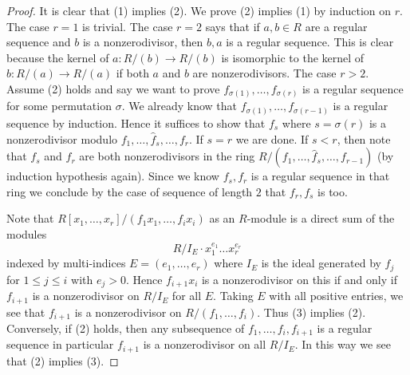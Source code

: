 \begin{proof}
It is clear that (1) implies (2). We prove (2) implies (1) by induction
on $r$. The case $r = 1$ is trivial. The case $r = 2$ says that if
$a, b \in R$ are a regular sequence and $b$ is a nonzerodivisor, then
$b, a$ is a regular sequence. This is clear because the kernel of
$a : R/(b) \to R/(b)$ is isomorphic to the kernel of $b : R/(a) \to R/(a)$
if both $a$ and $b$ are nonzerodivisors. The case $r > 2$. Assume
(2) holds and say we want to prove $f_{\sigma(1)}, \ldots, f_{\sigma(r)}$
is a regular sequence for some permutation $\sigma$. We already know
that $f_{\sigma(1)}, \ldots, f_{\sigma(r - 1)}$ is a regular sequence
by induction. Hence it suffices to show that $f_s$ where $s = \sigma(r)$
is a nonzerodivisor modulo $f_1, \ldots, \hat f_s, \ldots, f_r$.
If $s = r$ we are done. If $s < r$, then note that $f_s$ and $f_r$
are both nonzerodivisors in the ring
$R/(f_1, \ldots, \hat f_s, \ldots, f_{r - 1})$
(by induction hypothesis again). Since we know $f_s, f_r$ is a
regular sequence in that ring we conclude by the case of sequence of length
$2$ that $f_r, f_s$ is too.

\medskip\noindent
Note that $R[x_1, \ldots, x_r]/(f_1x_1, \ldots, f_ix_i)$ as an $R$-module
is a direct sum of the modules
$$
R/I_E \cdot x_1^{e_1} \ldots x_r^{e_r}
$$
indexed by multi-indices $E = (e_1, \ldots, e_r)$ where
$I_E$ is the ideal generated by $f_j$ for $1 \leq j \leq i$
with $e_j > 0$. Hence $f_{i + 1}x_i$ is a nonzerodivisor on this if
and only if $f_{i + 1}$ is a nonzerodivisor on $R/I_E$ for all $E$.
Taking $E$ with all positive entries, we see that $f_{i + 1}$
is a nonzerodivisor on $R/(f_1, \ldots, f_i)$. Thus (3) implies (2).
Conversely, if (2) holds, then any subsequence of
$f_1, \ldots, f_i, f_{i + 1}$ is a regular sequence
in particular $f_{i + 1}$ is a nonzerodivisor on all $R/I_E$.
In this way we see that (2) implies (3).
\end{proof}










